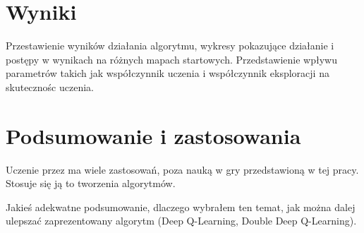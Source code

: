 \documentclass[a4paper,12pt]{article}
\begin{document}
\section{Wyniki}

Przestawienie wyników działania algorytmu, wykresy pokazujące działanie i postępy w wynikach na różnych mapach startowych. Przedstawienie wpływu parametrów takich jak współczynnik uczenia i współczynnik eksploracji na skutecznośc uczenia.

\section{Podsumowanie i zastosowania}

Uczenie przez ma wiele zastosowań, poza nauką w gry przedstawioną w tej pracy. Stosuje się ją to tworzenia algorytmów.

 Jakieś adekwatne podsumowanie, dlaczego wybrałem ten temat, jak można dalej ulepszać zaprezentowany algorytm (Deep Q-Learning, Double Deep Q-Learning).
\end{document}
